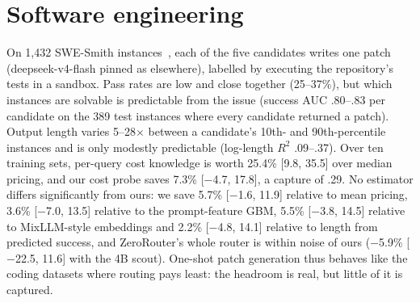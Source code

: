 \documentclass[10pt]{article}
\begin{document}
\section{Software engineering}\label{app:agents}
On 1,432 SWE-Smith instances~\citep{swesmith}, each of the five candidates writes one patch (deepseek-v4-flash pinned as elsewhere), labelled by executing the repository's tests in a sandbox. Pass rates are low and close together (25--37\%), but which instances are solvable is predictable from the issue (success AUC .80--.83 per candidate on the 389 test instances where every candidate returned a patch). Output length varies 5--28$\times$ between a candidate's 10th- and 90th-percentile instances and is only modestly predictable (log-length $R^2$ .09--.37). Over ten training sets, per-query cost knowledge is worth 25.4\% [9.8, 35.5] over median pricing, and our cost probe saves 7.3\% [$-$4.7, 17.8], a capture of .29. No estimator differs significantly from ours: we save 5.7\% [$-$1.6, 11.9] relative to mean pricing, 3.6\% [$-$7.0, 13.5] relative to the prompt-feature GBM, 5.5\% [$-$3.8, 14.5] relative to MixLLM-style embeddings and 2.2\% [$-$4.8, 14.1] relative to length from predicted success, and ZeroRouter's whole router is within noise of ours ($-$5.9\% [$-$22.5, 11.6] with the 4B scout). One-shot patch generation thus behaves like the coding datasets where routing pays least: the headroom is real, but little of it is captured.

\FloatBarrier
\end{document}
